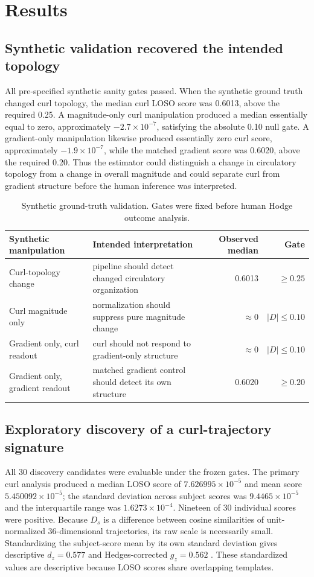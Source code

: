 \documentclass[12pt]{article}
\begin{document}
\section{Results}
\subsection{Synthetic validation recovered the intended topology}
All pre-specified synthetic sanity gates passed. When the synthetic ground truth changed curl topology, the median curl LOSO score was 0.6013, above the required 0.25. A magnitude-only curl manipulation produced a median essentially equal to zero, approximately $-2.7\times10^{-7}$, satisfying the absolute 0.10 null gate. A gradient-only manipulation likewise produced essentially zero curl score, approximately $-1.9\times10^{-7}$, while the matched gradient score was 0.6020, above the required 0.20. Thus the estimator could distinguish a change in circulatory topology from a change in overall magnitude and could separate curl from gradient structure before the human inference was interpreted.

\begin{table}[t]
\centering
\caption{Synthetic ground-truth validation. Gates were fixed before human Hodge outcome analysis.}
\label{tab:synthetic}
\small
\begin{tabularx}{\textwidth}{@{}lXrr@{}}
\toprule
Synthetic manipulation & Intended interpretation & Observed median & Gate\\
\midrule
Curl-topology change & pipeline should detect changed circulatory organization & 0.6013 & $\ge0.25$\\
Curl magnitude only & normalization should suppress pure magnitude change & $\approx0$ & $|D|\le0.10$\\
Gradient only, curl readout & curl should not respond to gradient-only structure & $\approx0$ & $|D|\le0.10$\\
Gradient only, gradient readout & matched gradient control should detect its own structure & 0.6020 & $\ge0.20$\\
\bottomrule
\end{tabularx}
\end{table}

\subsection{Exploratory discovery of a curl-trajectory signature}
All 30 discovery candidates were evaluable under the frozen gates. The primary curl analysis produced a median LOSO score of $7.626995\times10^{-5}$ and mean score $5.450092\times10^{-5}$; the standard deviation across subject scores was $9.4465\times10^{-5}$ and the interquartile range was $1.6273\times10^{-4}$. Nineteen of 30 individual scores were positive. Because $D_s$ is a difference between cosine similarities of unit-normalized 36-dimensional trajectories, its raw scale is necessarily small. Standardizing the subject-score mean by its own standard deviation gives descriptive $d_z=0.577$ and Hedges-corrected $g_z=0.562$ \citep{Lakens2013}. These standardized values are descriptive because LOSO scores share overlapping templates.
\end{document}

